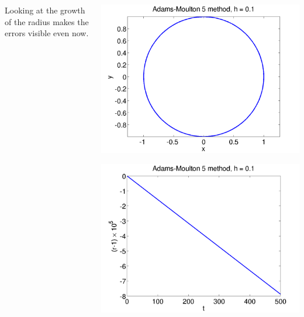 \documentclass{beamer}
\begin{document}
\begin{frame}
\begin{columns}
\begin{column}{0.5\textwidth}
\begin{overlayarea}{\textwidth}{0.4\textheight}
{          \vspace{1ex}
          Looking at the growth of the radius makes the errors
          visible even now.
        }
      \end{overlayarea}
    \end{column}
    \begin{column}{0.5\textwidth}
      \begin{overlayarea}{\textwidth}{0.6\textheight}
        {
          \begin{center}
            \includegraphics[height=0.5\textheight]{figures/AM5_1}
          \end{center}
        }
        {
          \begin{center}
            \includegraphics[height=0.5\textheight]{figures/AM5_rad1}

\end{center}}
\end{overlayarea}
\end{column}
\end{columns}
\end{frame}
\end{document}
